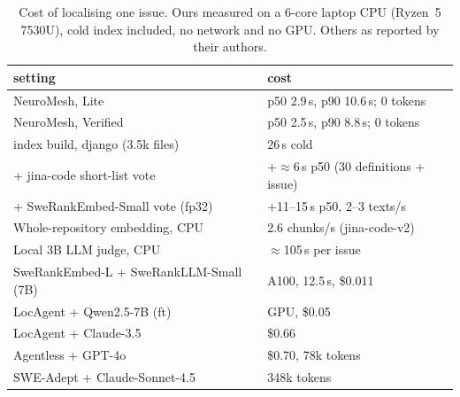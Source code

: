 \begin{table}[t]
\centering
\small
\caption{Cost of localising one issue. Ours measured on a 6-core laptop CPU (Ryzen~5 7530U), cold
index included, no network and no GPU. Others as reported by their authors.}
\label{tab:cost}
\setlength{\tabcolsep}{3pt}
\begin{tabular}{@{}p{}p{}@{}}
\toprule
setting & cost\\
\midrule
NeuroMesh, Lite & p50 2.9\,s, p90 10.6\,s; 0 tokens\\
NeuroMesh, Verified & p50 2.5\,s, p90 8.8\,s; 0 tokens\\
\quad index build, django (3.5k files) & 26\,s cold\\
\quad + jina-code short-list vote & +$\approx$6\,s p50 (30 definitions + issue)\\
\quad + SweRankEmbed-Small vote (fp32) & +11--15\,s p50, 2--3 texts/s\\
Whole-repository embedding, CPU & 2.6 chunks/s (jina-code-v2)\\
Local 3B LLM judge, CPU & $\approx$105\,s per issue\\
\midrule
SweRankEmbed-L + SweRankLLM-Small (7B) & A100, 12.5\,s, \$0.011\\
LocAgent + Qwen2.5-7B (ft) & GPU, \$0.05\\
LocAgent + Claude-3.5 & \$0.66\\
Agentless + GPT-4o & \$0.70, 78k tokens\\
SWE-Adept + Claude-Sonnet-4.5 & 348k tokens\\
\bottomrule
\end{tabular}
\end{table}
